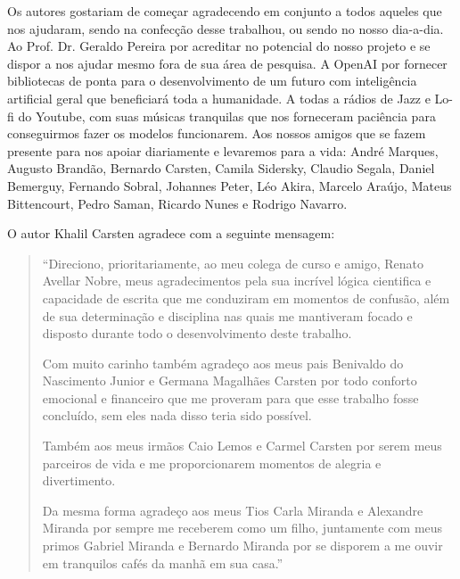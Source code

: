\newcommand{\forceindent}{\leavevmode{\parindent=1em\indent}}


Os autores gostariam de começar agradecendo em conjunto a todos aqueles que nos ajudaram, sendo na confecção desse trabalhou, ou sendo no nosso dia-a-dia. Ao Prof. Dr. Geraldo Pereira por acreditar no potencial do nosso projeto e se dispor a nos ajudar mesmo fora de sua área de pesquisa. A OpenAI por fornecer bibliotecas de ponta para o desenvolvimento de um futuro com inteligência artificial geral que beneficiará toda a humanidade. A todas a rádios de Jazz e Lo-fi do Youtube, com suas músicas tranquilas que nos forneceram paciência para conseguirmos fazer os modelos funcionarem. Aos nossos amigos que se fazem presente para nos apoiar diariamente e levaremos para a vida: André Marques, Augusto Brandão, Bernardo Carsten, Camila Sidersky, Claudio Segala, Daniel Bemerguy, Fernando Sobral, Johannes Peter, Léo Akira, Marcelo Araújo, Mateus Bittencourt, Pedro Saman, Ricardo Nunes e Rodrigo Navarro.

\vspace{5mm}

O autor Khalil Carsten agradece com a seguinte mensagem: 

\vspace{5mm}

\begin{quote}

\forceindent ``Direciono, prioritariamente, ao meu colega de curso e amigo, Renato Avellar Nobre, meus agradecimentos pela sua incrível lógica cientifica e capacidade de escrita que me conduziram em momentos de confusão, além de sua determinação e disciplina nas quais me mantiveram focado e disposto durante todo o desenvolvimento deste trabalho. 

\forceindent Com muito carinho também agradeço aos meus pais Benivaldo do Nascimento Junior e Germana Magalhães Carsten por todo conforto emocional e financeiro que me proveram para que esse trabalho fosse concluído, sem eles nada disso teria sido possível. 

\forceindent Também aos meus irmãos Caio Lemos e Carmel Carsten por serem meus parceiros de vida e me proporcionarem momentos de alegria e divertimento. 

\forceindent Da mesma forma agradeço aos meus Tios Carla Miranda e Alexandre Miranda por sempre me receberem como um filho, juntamente com meus primos Gabriel Miranda e Bernardo Miranda por se disporem a me ouvir em tranquilos cafés da manhã em sua casa.''

\end{quote}

